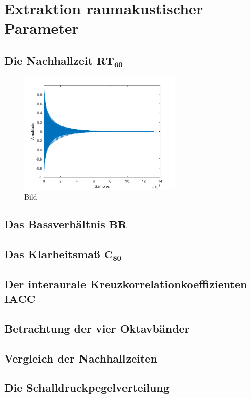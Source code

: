 \chapter{Extraktion raumakustischer Parameter}

\section{Die Nachhallzeit $\mathbf{RT_{60}}$}
\label{sec:rt60}

\begin{figure}[H]
    \center
    \includegraphics[width = 0.7\textwidth]{figures/samples.pdf}
    \caption{Bild}
    \label{fig:bs1}
\end{figure}


\section{Das Bassverhältnis $\mathbf{BR}$}
\label{sec:br}


\section{Das Klarheitsmaß $\mathbf{C_{80}}$}
\label{sec:c80}


\section{Der interaurale Kreuzkorrelationkoeffizienten $\mathbf{IACC}$}
\label{sec:iacc}


\section{Betrachtung der vier Oktavbänder}
\label{sec:bands}


\section{Vergleich der Nachhallzeiten}
\label{sec:ts}


\section{Die Schalldruckpegelverteilung}
\label{sec:sdpv}